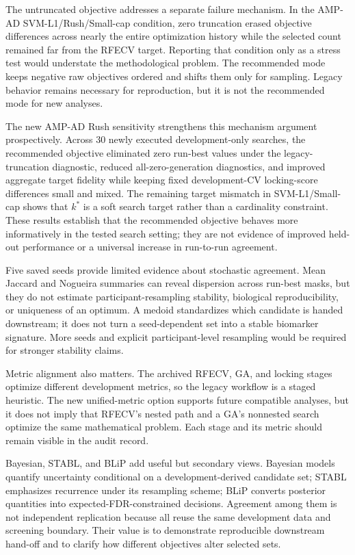 The untruncated objective addresses a separate failure mechanism. In the AMP-AD SVM-L1/Rush/Small-cap condition, zero truncation erased objective differences across nearly the entire optimization history while the selected count remained far from the RFECV target. Reporting that condition only as a stress test would understate the methodological problem. The recommended mode keeps negative raw objectives ordered and shifts them only for sampling. Legacy behavior remains necessary for reproduction, but it is not the recommended mode for new analyses.

The new AMP-AD Rush sensitivity strengthens this mechanism argument prospectively. Across 30 newly executed development-only searches, the recommended objective eliminated zero run-best values under the legacy-truncation diagnostic, reduced all-zero-generation diagnostics, and improved aggregate target fidelity while keeping fixed development-CV locking-score differences small and mixed. The remaining target mismatch in SVM-L1/Small-cap shows that \(k^*\) is a soft search target rather than a cardinality constraint. These results establish that the recommended objective behaves more informatively in the tested search setting; they are not evidence of improved held-out performance or a universal increase in run-to-run agreement.

Five saved seeds provide limited evidence about stochastic agreement. Mean Jaccard and Nogueira summaries can reveal dispersion across run-best masks, but they do not estimate participant-resampling stability, biological reproducibility, or uniqueness of an optimum. A medoid standardizes which candidate is handed downstream; it does not turn a seed-dependent set into a stable biomarker signature. More seeds and explicit participant-level resampling would be required for stronger stability claims.

Metric alignment also matters. The archived RFECV, GA, and locking stages optimize different development metrics, so the legacy workflow is a staged heuristic. The new unified-metric option supports future compatible analyses, but it does not imply that RFECV's nested path and a GA's nonnested search optimize the same mathematical problem. Each stage and its metric should remain visible in the audit record.

Bayesian, STABL, and BLiP add useful but secondary views. Bayesian models quantify uncertainty conditional on a development-derived candidate set; STABL emphasizes recurrence under its resampling scheme; BLiP converts posterior quantities into expected-FDR-constrained decisions. Agreement among them is not independent replication because all reuse the same development data and screening boundary. Their value is to demonstrate reproducible downstream hand-off and to clarify how different objectives alter selected sets.

